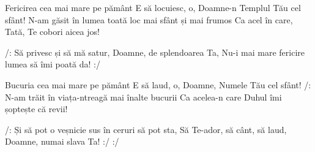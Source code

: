 \beginverse
Fericirea cea mai mare pe pământ
E să locuiesc, o, Doamne-n Templul Tău cel sfânt!
N-am găsit în lumea toată loc mai sfânt și mai frumos
Ca acel în care, Tată, Te cobori aicea jos!
\endverse

\beginchorus
/: Să privesc și să mă satur, Doamne, de splendoarea Ta,
Nu-i mai mare fericire lumea să îmi poată da! :/
\endchorus

\beginverse
Bucuria cea mai mare pe pământ
E să laud, o, Doamne, Numele Tău cel sfânt!
/: N-am trăit în viața-ntreagă mai înalte bucurii
Ca acelea-n care Duhul îmi șoptește că revii!
\endverse

\beginchorus
/: Și să pot o veșnicie sus în ceruri să pot sta,
Să Te-ador, să cânt, să laud, Doamne, numai slava Ta! :/ :/
\endchorus
\endsong